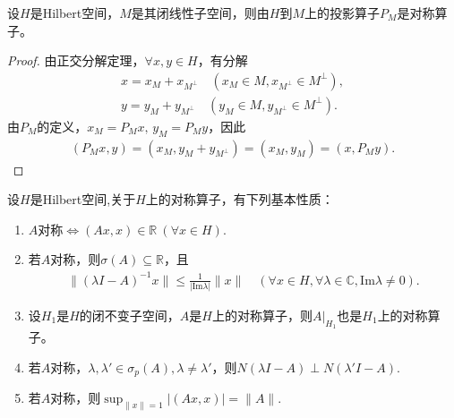 \documentclass[../../main.tex]{subfiles}%
\begin{document}
\begin{examples}
设$H$是Hilbert空间，$M$是其闭线性子空间，则由$H$到$M$上的投影算子$P_M$是对称算子。
\end{examples}
\begin{proof}
由正交分解定理，$\forall x,y\in H$，有分解
\begin{align*}
x=x_M+x_{M^\perp}\quad(x_M\in M,x_{M^\perp}\in M^\perp),\\
y=y_M+y_{M^\perp}\quad(y_M\in M,y_{M^\perp}\in M^\perp).
\end{align*}
由$P_M$的定义，$x_M=P_Mx,\,y_M=P_My$，因此
\begin{align*}
(P_Mx,y)=(x_M,y_M+y_{M^\perp})=(x_M,y_M)=(x,P_My).
\end{align*}
\end{proof}

\begin{proposition}
设$H$是Hilbert空间,关于$H$上的对称算子，有下列基本性质：
\begin{enumerate}[(1)]
\item $A$对称$\iff(Ax,x)\in\mathbb{R}\ (\forall x\in H)$.
\item 若$A$对称，则$\sigma(A)\subseteq\mathbb{R}$，且
\begin{align*}
\|(\lambda I-A)^{-1}x\|\leqslant\frac{1}{|\mathrm{Im}\lambda|}\|x\|\quad(\forall x\in H,\forall\lambda\in\mathbb{C},\mathrm{Im}\lambda\neq0).
\end{align*}
\item 设$H_1$是$H$的闭不变子空间，$A$是$H$上的对称算子，则$A|_{H_1}$也是$H_1$上的对称算子。
\item 若$A$对称，$\lambda,\lambda'\in\sigma_p(A),\lambda\neq\lambda'$，则$N(\lambda I-A)\perp N(\lambda'I-A)$.
\item 若$A$对称，则$\displaystyle\sup_{\|x\|=1}|(Ax,x)|=\|A\|$.
\end{enumerate}
\end{proposition}
\end{document}

